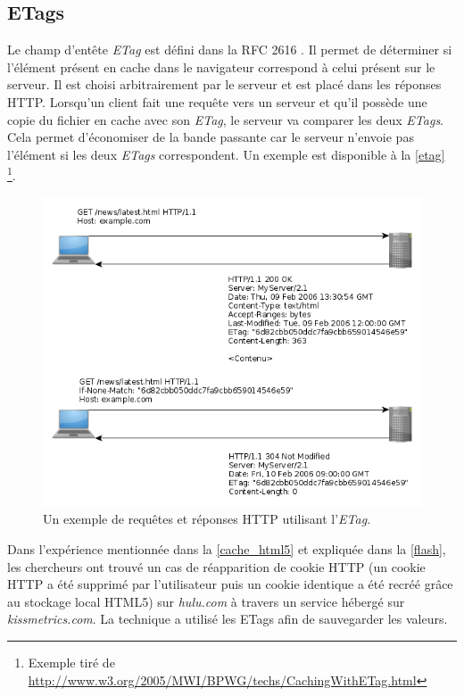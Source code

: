 \subsection{ETags}
\label{cache_etags}
Le champ d'entête \textit{ETag} est défini dans la RFC 2616 \cite{IETF_RFC2616}. Il permet de déterminer si l'élément présent en cache dans le navigateur correspond à celui présent sur le serveur. Il est choisi arbitrairement par le serveur et est placé dans les réponses HTTP. Lorsqu'un client fait une requête vers un serveur et qu'il possède une copie du fichier en cache avec son \textit{ETag}, le serveur va comparer les deux \textit{ETags}. Cela permet d'économiser de la bande passante car le serveur n'envoie pas l'élément si les deux \textit{ETags} correspondent. Un exemple est disponible à la \autoref{etag} \footnote{Exemple tiré de \url{http://www.w3.org/2005/MWI/BPWG/techs/CachingWithETag.html}}.
\begin{figure}[h]
	\centering
	\includegraphics[scale=0.55]{figures/Etag.png}
	\caption{\label{etag}Un exemple de requêtes et réponses HTTP utilisant l'\textit{ETag}.}
\end{figure}
\newline

Dans l'expérience mentionnée dans la \autoref{cache_html5} et expliquée dans la \autoref{flash}, les chercheurs ont trouvé un cas de réapparition de cookie HTTP (un cookie HTTP a été supprimé par l'utilisateur puis un cookie identique a été recréé grâce au stockage local HTML5) sur \textit{hulu.com} à travers un service hébergé sur \textit{kissmetrics.com}. La technique a utilisé les ETags afin de sauvegarder les valeurs.
\newline

